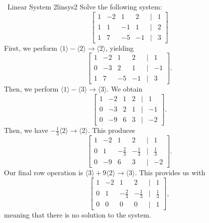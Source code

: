     \pagebreak
    \begin{example}{\Difficulty\,\Difficulty\,\,Linear System 2}{linsys2}
        Solve the following system:
        \begin{equation*}
            \begin{bmatrix}
                1 & -2 & 1 & 2 & | & 1 \\
                1 & 1 & -1 & 1 & | & 2 \\
                1 & 7 & -5 & -1 & | & 3
            \end{bmatrix}
        \end{equation*}
        First, we perform \(\langle 1\rangle -\langle 2\rangle\to\langle 2\rangle\), yielding
        \begin{equation*}
            \begin{bmatrix}
                1 & -2 & 1 & 2 & | & 1 \\
                0 & -3 & 2 & 1 & | & -1 \\
                1 & 7 & -5 & -1 & | & 3
            \end{bmatrix}.
        \end{equation*}
        Then, we perform \(\langle 1\rangle-\langle 3\rangle\to\langle 3\rangle\). We obtain
        \begin{equation*}
            \begin{bmatrix}
                1 & -2 & 1 & 2 & | & 1 \\
                0 & -3 & 2 & 1 & | & -1 \\
                0 & -9 & 6 & 3 & | & -2 
            \end{bmatrix}.
        \end{equation*}
        Then, we have \(-\frac{1}{3}\langle 2\rangle\to\langle 2\rangle\). This produces
        \begin{equation*}
            \begin{bmatrix}
                1 & -2 & 1 & 2 & | & 1 \\
                0 & 1 & -\frac{2}{3} & -\frac{1}{3} & | & \frac{1}{3} \\
                0 & -9 & 6 & 3 & | & -2
            \end{bmatrix}.
        \end{equation*}
        Our final row operation is \(\langle3\rangle+9\langle2\rangle\to\langle 3\rangle\). This provides us with
        \begin{equation*}
            \begin{bmatrix}
                 1 & -2 & 1 & 2 & | & 1 \\
                 0 & 1 & -\frac{2}{3} & -\frac{1}{3} & | & \frac{1}{3} \\
                 0 & 0 & 0 & 0 & | & 1
            \end{bmatrix},
        \end{equation*}
        meaning that there is no solution to the system.
    \end{example}
